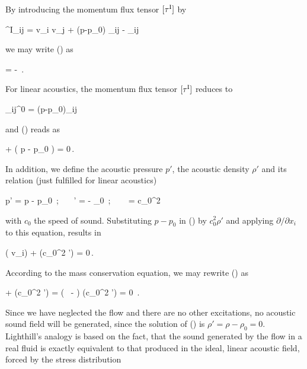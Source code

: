 \documentclass[a4paper,10pt]{article}
\begin{document}
\noindent
By introducing the momentum flux tensor $[\tau^{\rm I} ]$ by

\tau^{\rm I}_{ij} = \rho v_i v_j + (p-p_0) \delta_{ij} - \tau_{ij}
\ee

\noindent
we may write () as

  = - \,.
\ee

\noindent
For linear acoustics, the momentum flux tensor $[\tau^{\rm I}]$ reduces to

\tau_{ij}^0 = (p-p_0)\delta_{ij} 
\ee

\noindent
and () reads as

   + 
 \left( p - p_0 \right) = 0\,. 
\ee

\noindent
In addition,  we define the  acoustic pressure $p'$, the  acoustic density
$\rho'$ and its relation (just fulfilled for linear acoustics)

p' = p - p_0 \,; \ \ \ \rho' = \rho - \rho_0 \,; \ \ \
 = c_0^2
\ee

\noindent
with $c_0$ the speed  of sound. Substituting $p-p_0$ in ()
by $c_0^2 \rho'$ and applying  $\partial / \partial x_i$ to this equation,
results in

  ( \rho
v_i) + \frac{\partial^2 }{\partial x_i^2} (c_0^2 \rho') = 0\,.
\ee

\noindent
According   to   the   mass   conservation  equation,   we   may   rewrite
(\eqnref{contxx}) as

 +  (c_0^2 \rho') =
\left(  \,   - \frac{\partial^2
}{\partial x_i^2}\right) (c_0^2 \rho')  
= 0 \,.
\ee

\noindent
Since we  have neglected the flow  and there are no  other excitations, no
acoustic sound field will be  generated, since the solution of ()
is $\rho' = \rho - \rho_0 = 0$.\\

Lighthill's analogy is based on the  fact, that the sound generated by the
flow in a real fluid is  exactly equivalent to that produced in the ideal,
linear acoustic field, forced by the stress distribution
\end{document}
